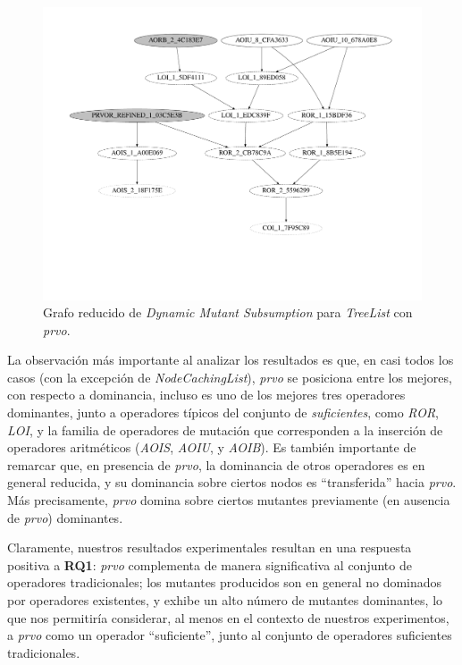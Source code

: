 \begin{figure}
	\includegraphics[width=\linewidth]{figures/subsumption/dsg_apache_prvo_segment.pdf}
	\caption{Grafo reducido de \emph{Dynamic Mutant Subsumption} para \emph{TreeList} con \emph{prvo}.}
	\label{figures.examples.subsumption.reducedTreeListGraph}
\end{figure}

La observaci\'on m\'as importante al analizar los resultados es que, en casi todos los casos (con la excepci\'on de \emph{NodeCachingList}), \emph{prvo} se posiciona entre los mejores, con respecto a dominancia, incluso es uno de los mejores tres operadores dominantes, junto a operadores t\'ipicos del conjunto de \emph{suficientes}, como \emph{ROR}, \emph{LOI}, y la familia de operadores de mutaci\'on que corresponden a la inserci\'on de operadores aritm\'eticos (\emph{AOIS}, \emph{AOIU}, y \emph{AOIB}). Es tambi\'en importante de remarcar que, en presencia de \emph{prvo}, la dominancia de otros operadores es en general reducida, y su dominancia sobre ciertos nodos es ``transferida'' hacia \emph{prvo}. M\'as precisamente, \emph{prvo} domina sobre ciertos mutantes previamente (en ausencia de \emph{prvo}) dominantes.

Claramente, nuestros resultados experimentales resultan en una respuesta positiva a \textbf{RQ1}: \emph{prvo} complementa de manera significativa al conjunto de operadores tradicionales; los mutantes producidos son en general no dominados por operadores existentes, y exhibe un alto n\'umero de mutantes dominantes, lo que nos permitir\'ia considerar, al menos en el contexto de nuestros experimentos, a \emph{prvo} como un operador ``suficiente'', junto al conjunto de operadores suficientes tradicionales.

